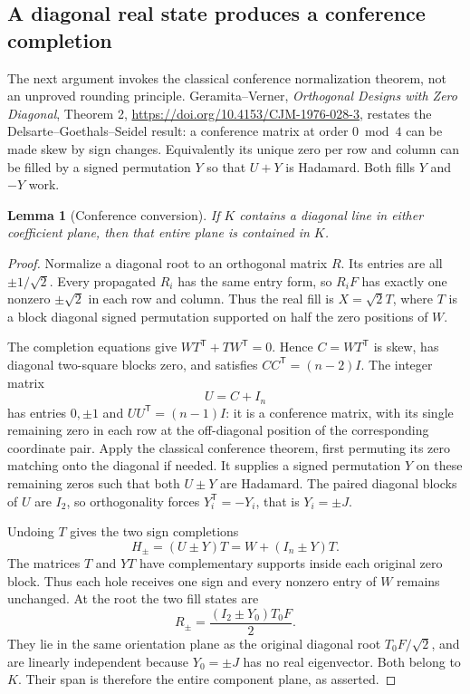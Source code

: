 \documentclass[11pt]{article}
\newtheorem{lemma}[theorem]{Lemma}
\begin{document}
\subsection{A diagonal real state produces a conference completion}
The next argument invokes the classical conference normalization
theorem, not an unproved rounding principle. Geramita--Verner,
\emph{Orthogonal Designs with Zero Diagonal}, Theorem 2,
\url{https://doi.org/10.4153/CJM-1976-028-3}, restates the
Delsarte--Goethals--Seidel result: a conference matrix at order
$0\bmod4$ can be made skew by sign changes. Equivalently its
unique zero per row and column can be filled by a signed permutation
$Y$ so that $U+Y$ is Hadamard. Both fills $Y$ and $-Y$ work.

\begin{lemma}[Conference conversion]
If $K$ contains a diagonal line in either coefficient plane, then
that entire plane is contained in $K$.
\end{lemma}
\begin{proof}
Normalize a diagonal root to an orthogonal matrix $R$. Its entries
are all $\pm1/\sqrt2$. Every propagated $R_i$ has the same entry
form, so $R_iF$ has exactly one nonzero $\pm\sqrt2$ in each row
and column. Thus the real fill is $X=\sqrt2T$, where $T$ is a
block diagonal signed permutation supported on half the zero
positions of $W$.

The completion equations give
$WT^{\mathsf T}+TW^{\mathsf T}=0$. Hence
$C=WT^{\mathsf T}$ is skew, has diagonal two-square blocks zero,
and satisfies $CC^{\mathsf T}=(n-2)I$. The integer matrix
\[
 U=C+I_n
\]
has entries $0,\pm1$ and $UU^{\mathsf T}=(n-1)I$: it is a
conference matrix, with its single remaining zero in each row at
the off-diagonal position of the corresponding coordinate pair.
Apply the classical conference theorem, first permuting its zero
matching onto the diagonal if needed. It supplies a signed
permutation $Y$ on these remaining zeros such that both $U\pm Y$
are Hadamard. The paired diagonal blocks of $U$ are $I_2$, so
orthogonality forces $Y_i^{\mathsf T}=-Y_i$, that is $Y_i=\pm J$.

Undoing $T$ gives the two sign completions
\[
 H_\pm=(U\pm Y)T=W+(I_n\pm Y)T.
\]
The matrices $T$ and $YT$ have complementary supports inside each
original zero block. Thus each hole receives one sign and every
nonzero entry of $W$ remains unchanged. At the root the two fill
states are
\[
 R_\pm=\frac{(I_2\pm Y_0)T_0F}{2}.
\]
They lie in the same orientation plane as the original diagonal
root $T_0F/\sqrt2$, and are linearly independent because $Y_0=\pm J$
has no real eigenvector. Both belong to $K$. Their span is therefore
the entire component plane, as asserted.
\end{proof}
\end{document}
